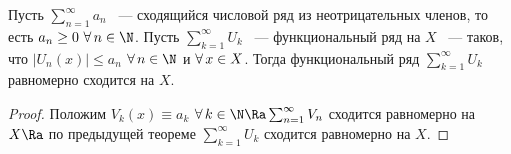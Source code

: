 \begin{corollary}
    Пусть $\sum_{n = 1}^{\infty} a_{n}$ ~--- сходящийся числовой ряд из неотрицательных членов, то есть $a_{n} \geq 0 \thinspace\thinspace \forall\thinspace n \in \N$. Пусть $\sum_{k = 1}^{\infty}U_{k}$ ~--- функциональный ряд на $X$ ~--- таков, что $\left| U_{n}(x) \right| \leq a_{n}$ $\forall\thinspace n \in \N$ и $\forall\thinspace x \in X$. Тогда функциональный ряд $\sum_{k = 1}^{\infty}U_k$ равномерно сходится на $X$.
\end{corollary}

\begin{proof}
    Положим $V_k(x) \equiv a_k$ $\forall\thinspace k \in \N \Ra \sum_{n = 1}^{\infty} V_n$ сходится равномерно на $X \Ra$ по предыдущей теореме $\sum_{k = 1}^{\infty} U_k$ сходится равномерно на $X$.
\end{proof}

